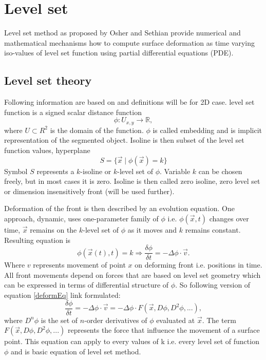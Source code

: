 \section{Level set}

Level set method as proposed by Osher and Sethian \cite{sethianLS} provide numerical and mathematical mechanisms how to compute surface deformation as time varying iso-values of level set function using partial differential equations (PDE).

\subsection{Level set theory}

Following information are based on \cite{insightIntoImages} and definitions will be for 2D case.
level set function is a signed scalar distance function
\begin{equation}
\phi : U_{x,y} \rightarrow \mathbb R,
\end{equation}
where $U \subset R^2$ is the domain of the function.
$\phi$ is called embedding and is implicit representation of the segmented object.
Isoline is then subset of the level set function values, hyperplane
\begin{equation}
S = \{\vec{x}\mid \phi(\vec{x}) = k\}
\end{equation}
Symbol $S$ represents a $k$-isoline or $k$-level set of $\phi$.
Variable $k$ can be chosen freely, but in most cases it is zero.
Isoline is then called zero isoline, zero level set or dimension insensitively front (will be used further).

\par
Deformation of the front is then described by an evolution equation.
One approach, dynamic, uses one-parameter family of $\phi$ i.e. $\phi(\vec{x},t)$ changes over time, $\vec{x}$ remains on the $k$-level set of $\phi$ as it moves and $k$ remains constant.
Resulting equation is
\begin{equation}
\label{deformEq}
\phi(\vec{x}(t),t) = k \Rightarrow \frac{\delta \phi}{\delta t} = - \Delta \phi
\cdot \vec{v}.
\end{equation}
Where $v$ represents movement of point $x$ on deforming front i.e. positions in time.
All front movements depend on forces that are based on level set geometry which can be expressed in terms of differential structure of $\phi$.
So following version of equation \ref{deformEq} link formulated:
\begin{equation}
\frac{\delta\phi}{\delta t} = - \Delta \phi \cdot \vec{v} = - \Delta \phi
\cdot F(\vec{x}, D\phi, D^2\phi, ...),
\end{equation}
where $D^n\phi$ is the set of $n$-order derivatives of $\phi$ evaluated at $\vec{x}$.
The term $F(\vec{x}, D\phi, D^2\phi, ...)$ represents the force that influence the movement of a surface point.
This equation can apply to every values of k i.e. every level set of function $\phi$ and is basic equation of level set method.

